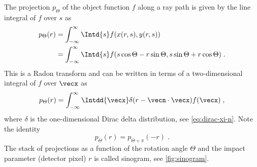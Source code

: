 \documentclass[
twoside,
openright,
titlepage,
numbers=noenddot,
headinclude,
fleqn,
a4paper,
footinclude=true,
cleardoublepage=empty,
abstractoff,
BCOR=5mm,
paper=a4,
fontsize=11pt,
british,ngerman,american,
]{scrreprt}
\begin{document}
The projection $p_\Theta$ of the object function $f$ along a ray
path is given by the line integral of $f$ over $s$ as
\begin{equation}
  \label{eq:projection-line-integral}
  \begin{split}
    p_\Theta(r) & = \int_{-\infty}^\infty \Intd{s}f(x(r,s),y(r,s))
    \\ & = \int_{-\infty}^\infty 
    \Intd{s}f(s\cos\Theta-r\sin\Theta,s\sin\Theta+r\cos\Theta) \;.
  \end{split}
\end{equation}
This is a Radon transform and can be written in terms of
a two-dimensional integral of  $f$ over $\vecx$ as
\begin{equation}
  \label{eq:projection-radon}
    p_\Theta(r)
 =\int_{-\infty}^\infty\Intdd{\vecx}\delta(r-\vecn\cdot\vecx)f(\vecx)\;,
\end{equation}
where $\delta$ is the one-dimensional Dirac delta distribution,
see \cref{eq:dirac-xi-n}. Note the identity 
\begin{equation}
  \label{eq:radon-relation}
  p_\Theta(r) = p_{\Theta+\pi}(-r) \;.
\end{equation}
The stack of projections as a function of the rotation angle $\Theta$
and the impact parameter (detector pixel) $r$ is called sinogram, see
\eg{} \cref{fig:sinogram}.
\end{document}
